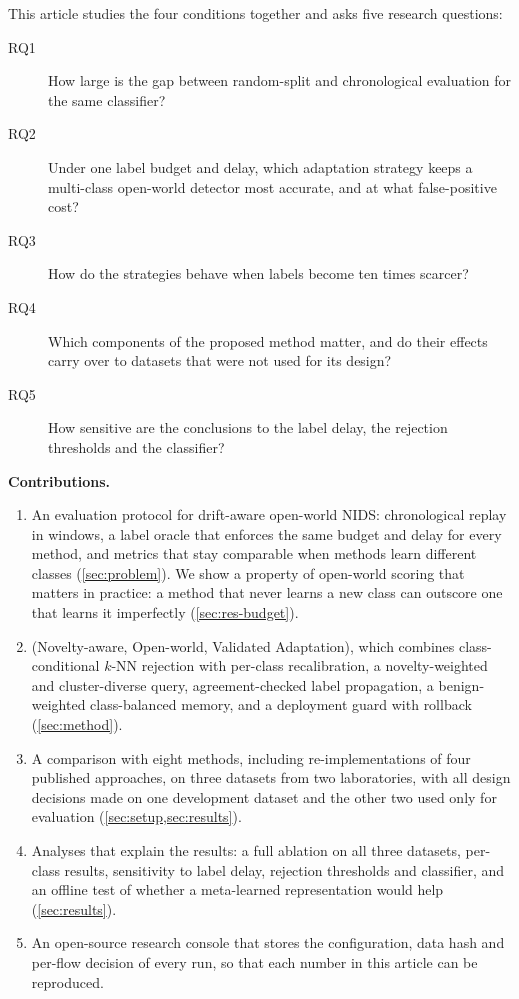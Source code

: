 This article studies the four conditions together and asks five research questions:
\begin{description}
  \item[RQ1] How large is the gap between random-split and chronological evaluation for the same classifier?
  \item[RQ2] Under one label budget and delay, which adaptation strategy keeps a multi-class open-world detector
        most accurate, and at what false-positive cost?
  \item[RQ3] How do the strategies behave when labels become ten times scarcer?
  \item[RQ4] Which components of the proposed method matter, and do their effects carry over to datasets that were
        not used for its design?
  \item[RQ5] How sensitive are the conclusions to the label delay, the rejection thresholds and the classifier?
\end{description}

\textbf{Contributions.}
\begin{enumerate}
  \item An evaluation protocol for drift-aware open-world NIDS: chronological replay in windows, a label oracle
        that enforces the same budget and delay for every method, and metrics that stay comparable when methods
        learn different classes (\cref{sec:problem}). We show a property of open-world scoring that matters in
        practice: a method that never learns a new class can outscore one that learns it imperfectly
        (\cref{sec:res-budget}).
  \item \nova{} (Novelty-aware, Open-world, Validated Adaptation), which combines class-conditional $k$-NN
        rejection with per-class recalibration, a novelty-weighted and cluster-diverse query, agreement-checked
        label propagation, a benign-weighted class-balanced memory, and a deployment guard with rollback
        (\cref{sec:method}).
  \item A comparison with eight methods, including re-implementations of four published approaches, on three
        datasets from two laboratories, with all design decisions made on one development dataset and the other
        two used only for evaluation (\cref{sec:setup,sec:results}).
  \item Analyses that explain the results: a full ablation on all three datasets, per-class results, sensitivity
        to label delay, rejection thresholds and classifier, and an offline test of whether a meta-learned
        representation would help (\cref{sec:results}).
  \item An open-source research console that stores the configuration, data hash and per-flow decision of every
        run, so that each number in this article can be reproduced.
\end{enumerate}

